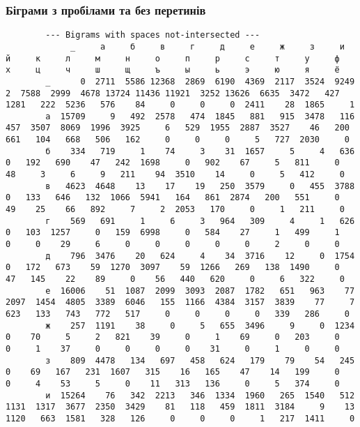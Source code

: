 \documentclass{article}
\begin{document}
\begin{landscape}
	\tiny
	\vspace{-1em}
	\subsubsection{Біграми з пробілами та без перетинів}
	\begin{addmargin}{0em}
		\begin{verbatim}
		--- Bigrams with spaces not-intersected ---
		     _     а     б     в     г     д     е     ж     з     и     й     к     л     м     н     о     п     р     с     т     у     ф     х     ц     ч     ш     щ     ъ     ы     ь     э     ю     я     ё    
		_      0  2711  5586 12368  2869  6190  4369  2117  3524  9249     2  7588  2999  4678 13724 11436 11921  3252 13626  6635  3472   427  1281   222  5236   576    84     0     0     0  2411    28  1865     1
		а  15709     9   492  2578   474  1845   881   915  3478   116   457  3507  8069  1996  3925     6   529  1955  2887  3527    46   200   661   104   668   506   162     0     0     0     5   727  2030     0
		б    334   719     1    74     3    31  1657     5     4   636     0   192   690    47   242  1698     0   902    67     5   811     0    48     3     6     9   211    94  3510    14     0     5   412     0
		в   4623  4648    13    17    19   250  3579     0   455  3788     0   133   646   132  1066  5941   164   861  2874   200   551     0    49    25    66   892     7     2  2053   170     0     1   211     0
		г    569   691     1     6     3   964   309     4     1   626     0   103  1257     0   159  6998     0   584    27     1   499     1     0     0    29     6     0     0     0     0     0     2     0     0
		д    796  3476    20   624     4    34  3716    12     0  1754     0   172   673    59  1270  3097    59  1266   269   138  1490     0    47   145    22    89     0    56   440   620     0     6   322     0
		е  16006    51  1087  2099  3093  2087  1782   651   963    77  2097  1454  4805  3389  6046   155  1166  4384  3157  3839    77     7   623   133   743   772   517     0     0     0     0   339   286     0
		ж    257  1191    38     0     5   655  3496     9     0  1234     0    70     5     2   821    39     0     1    69     0   203     0     0     1    37     0     0     0     0    31     0     1     0     0
		з    809  4478   134   697   458   624   179    79    54   245     0    69   167   231  1607   315    16   165    47    14   199     0     0     4    53     5     0    11   313   136     0     5   374     0
		и  15264    76   342  2213   346  1334  1960   265  1540   512  1131  1317  3677  2350  3429    81   118   459  1811  3184     9    13  1120   663  1581   328   126     0     0     0     1   217  1411     0

\end{verbatim}
\end{addmargin}
\end{landscape}
\end{document}
